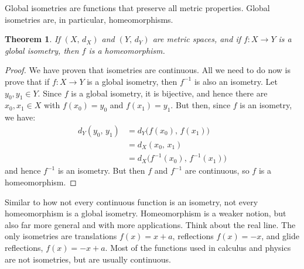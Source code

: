 \documentclass{article}
\theoremstyle{plain}
\newtheorem{theorem}{Theorem}[section]
\theoremstyle{normal}
\begin{document}
        Global isometries are functions that preserve all metric properties.
        Global isometries are, in particular, homeomorphisms.
        \begin{theorem}
            If $(X,\,d_{X})$ and $(Y,\,d_{Y})$ are metric spaces, and if
            $f:X\rightarrow{Y}$ is a global isometry, then $f$ is a
            homeomorphism.
        \end{theorem}
        \begin{proof}
            We have proven that isometries are continuous. All we need to do
            now is prove that if $f:X\rightarrow{Y}$ is a global isometry,
            then $f^{-1}$ is also an isometry. Let $y_{0},y_{1}\in{Y}$.
            Since $f$ is a global isometry, it is bijective, and hence there
            are $x_{0},x_{1}\in{X}$ with $f(x_{0})=y_{0}$ and $f(x_{1})=y_{1}$.
            But then, since $f$ is an isometry, we have:
            \begin{align}
                d_{Y}(y_{0},\,y_{1})
                    &=d_{Y}\big(f(x_{0}),\,f(x_{1})\big)\\
                    &=d_{X}(x_{0},\,x_{1})\\
                    &=d_{X}\big(f^{-1}(x_{0}),\,f^{-1}(x_{1})\big)
            \end{align}
            and hence $f^{-1}$ is an isometry. But then $f$ and $f^{-1}$ are
            continuous, so $f$ is a homeomorphism.
        \end{proof}
        Similar to how not every continuous function is an isometry, not every
        homeomorphism is a global isometry. Homeomorphism is a weaker notion,
        but also far more general and with more applications. Think about
        the real line. The only isometries are translations
        $f(x)=x+a$, reflections $f(x)=-x$, and glide reflections,
        $f(x)=-x+a$. Most of the functions used in calculus and physics are not
        isometries, but are usually continuous.
\end{document}
